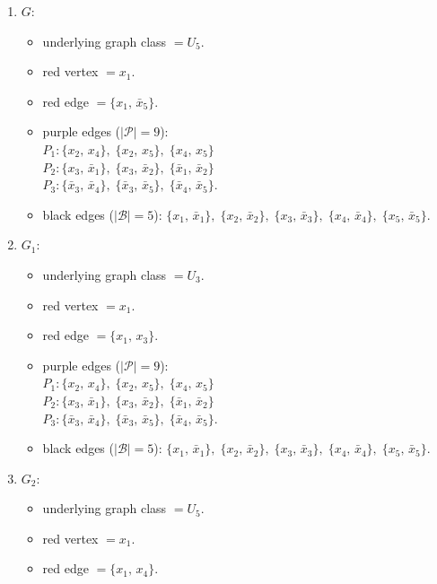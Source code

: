 \begin{enumerate}[leftmargin=*]
\item $G$:
\begin{itemize}[leftmargin=*]
\item underlying graph class $= U_5$.
\item red vertex $= x_{1}$.
\item red edge $= \{x_{1},\,\bar{x}_{5}\}$.
\item purple edges ($|\mathcal{P}|=9$):\mbox{}\\
$P_{1}: \{x_{2},\,x_{4}\},\; \{x_{2},\,x_{5}\},\; \{x_{4},\,x_{5}\}$\\
$P_{2}: \{x_{3},\,\bar{x}_{1}\},\; \{x_{3},\,\bar{x}_{2}\},\; \{\bar{x}_{1},\,\bar{x}_{2}\}$\\
$P_{3}: \{\bar{x}_{3},\,\bar{x}_{4}\},\; \{\bar{x}_{3},\,\bar{x}_{5}\},\; \{\bar{x}_{4},\,\bar{x}_{5}\}$.
\item black edges ($|\mathcal{B}|=5$): $\{x_{1},\,\bar{x}_{1}\},\; \{x_{2},\,\bar{x}_{2}\},\; \{x_{3},\,\bar{x}_{3}\},\; \{x_{4},\,\bar{x}_{4}\},\; \{x_{5},\,\bar{x}_{5}\}$.
\end{itemize}
\item $G_{1}$:
\begin{itemize}[leftmargin=*]
\item underlying graph class $= U_3$.
\item red vertex $= x_{1}$.
\item red edge $= \{x_{1},\,x_{3}\}$.
\item purple edges ($|\mathcal{P}|=9$):\mbox{}\\
$P_{1}: \{x_{2},\,x_{4}\},\; \{x_{2},\,x_{5}\},\; \{x_{4},\,x_{5}\}$\\
$P_{2}: \{x_{3},\,\bar{x}_{1}\},\; \{x_{3},\,\bar{x}_{2}\},\; \{\bar{x}_{1},\,\bar{x}_{2}\}$\\
$P_{3}: \{\bar{x}_{3},\,\bar{x}_{4}\},\; \{\bar{x}_{3},\,\bar{x}_{5}\},\; \{\bar{x}_{4},\,\bar{x}_{5}\}$.
\item black edges ($|\mathcal{B}|=5$): $\{x_{1},\,\bar{x}_{1}\},\; \{x_{2},\,\bar{x}_{2}\},\; \{x_{3},\,\bar{x}_{3}\},\; \{x_{4},\,\bar{x}_{4}\},\; \{x_{5},\,\bar{x}_{5}\}$.
\end{itemize}
\item $G_{2}$:
\begin{itemize}[leftmargin=*]
\item underlying graph class $= U_5$.
\item red vertex $= x_{1}$.
\item red edge $= \{x_{1},\,x_{4}\}$.

\end{itemize}
\end{enumerate}
